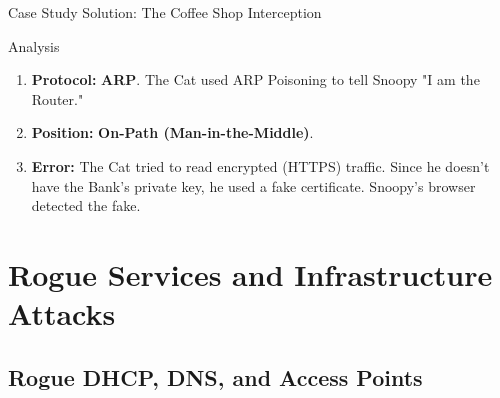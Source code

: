 \documentclass[aspectratio=169]{beamer}  %
\begin{document}
\begin{frame}{Case Study Solution: The Coffee Shop Interception}
    \begin{exampleblock}{Analysis}
        \footnotesize
        \begin{enumerate}
            \item \textbf{Protocol:} \textbf{ARP}. The Cat used ARP Poisoning to tell Snoopy "I am the Router."
            \item \textbf{Position:} \textbf{On-Path (Man-in-the-Middle)}.
            \item \textbf{Error:} The Cat tried to read encrypted (HTTPS) traffic. Since he doesn't have the Bank's private key, he used a fake certificate. Snoopy's browser detected the fake.
        \end{enumerate}
    \end{exampleblock}
    \begin{center}
    \end{center}
\end{frame}


\section{Rogue Services and Infrastructure Attacks}
\subsection{Rogue DHCP, DNS, and Access Points}

\end{document}
